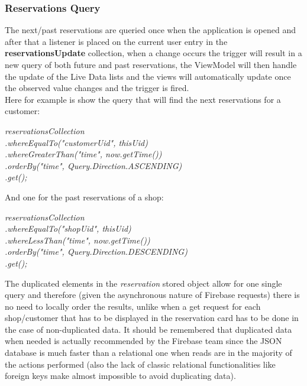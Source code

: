 \subsubsection{Reservations Query}
The next/past reservations are queried once when the application is opened and after that a listener is placed on the current user entry in the \textbf{reservationsUpdate} collection, when a change occurs the trigger will result in a new query of both future and past reservations, the ViewModel will then handle the update of the Live Data lists and the views will automatically update once the observed value changes and the trigger is fired.\\
Here for example is show the query that will find the next reservations for a customer:
\begin{center}
\textit{reservationsCollection\\
.whereEqualTo("customerUid", thisUid)\\
.whereGreaterThan("time", now.getTime())\\
.orderBy("time", Query.Direction.ASCENDING)\\
.get();}
\end{center}
And one for the past reservations of a shop:
\begin{center}
\textit{reservationsCollection\\
.whereEqualTo("shopUid", thisUid)\\
.whereLessThan("time", now.getTime())\\
.orderBy("time", Query.Direction.DESCENDING)\\
.get();}
\end{center}
The duplicated elements in the \textit{reservation} stored object allow for one single query and therefore (given the asynchronous nature of Firebase requests) there is no need to locally order the results, unlike when a get request for each shop/customer that has to be displayed in the reservation card has to be done in the case of non-duplicated data. It should be remembered that duplicated data when needed is actually recommended by the Firebase team since the JSON database is much faster than a relational one when reads are in the majority of the actions performed (also the lack of classic relational functionalities like foreign keys make almost impossible to avoid duplicating data).
